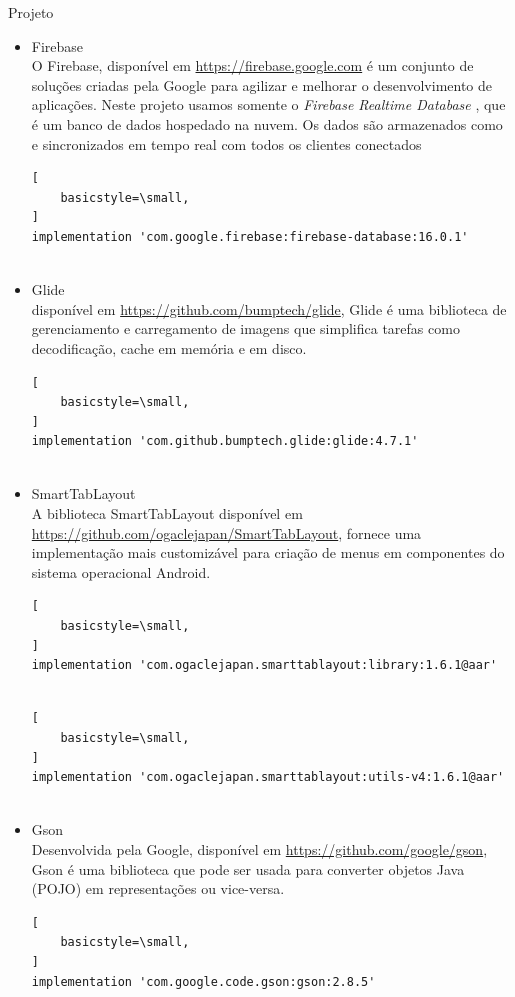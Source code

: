 \documentclass[
	12pt,				%
	openany,			%
	twoside,			%
	a4paper,			%
	english,			%
	french,				%
	spanish,			%
	brazil				%
	]{abntex2}
\begin{document}
\begin{chapter}{Projeto}
\begin{itemize}
\begin{lstlisting}[
    basicstyle=\small,
]
\end{lstlisting}
\item{Firebase} \\
O Firebase, disponível em \url{https://firebase.google.com} é um conjunto de soluções criadas pela Google para agilizar e melhorar o desenvolvimento de aplicações. Neste projeto usamos somente o \textit{Firebase Realtime Database} , que é um banco de dados hospedado na nuvem. Os dados são armazenados como  e sincronizados em tempo real com todos os clientes conectados
        \begin{lstlisting}[
    basicstyle=\small,
]
implementation 'com.google.firebase:firebase-database:16.0.1'
  
\end{lstlisting}
\item{Glide} \\
   disponível em \url{https://github.com/bumptech/glide}, Glide é uma biblioteca de gerenciamento e carregamento de imagens 
que simplifica tarefas como decodificação, cache em memória e em disco. 
        \begin{lstlisting}[
    basicstyle=\small,
]
implementation 'com.github.bumptech.glide:glide:4.7.1'
  
\end{lstlisting}
\item{SmartTabLayout} \\
 A biblioteca SmartTabLayout disponível em \url{https://github.com/ogaclejapan/SmartTabLayout}, fornece uma implementação mais customizável 
para criação de menus em componentes do sistema operacional Android.
         \begin{lstlisting}[
    basicstyle=\small,
]
implementation 'com.ogaclejapan.smarttablayout:library:1.6.1@aar'
   
\end{lstlisting}
        \begin{lstlisting}[
    basicstyle=\small,
]
implementation 'com.ogaclejapan.smarttablayout:utils-v4:1.6.1@aar'
   
\end{lstlisting}
\item{Gson} \\
   Desenvolvida pela Google, disponível em \url{https://github.com/google/gson}, Gson é uma biblioteca que pode ser usada para converter objetos Java (POJO) em representações  ou vice-versa.
         \begin{lstlisting}[
    basicstyle=\small,
]
implementation 'com.google.code.gson:gson:2.8.5'
    

\end{lstlisting}
\end{itemize}
\end{chapter}
\end{document}
